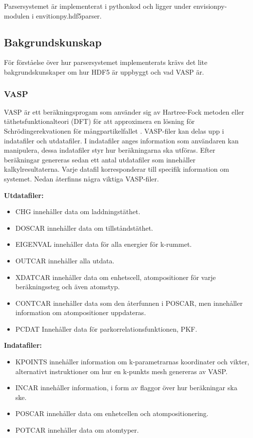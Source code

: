 \documentclass[10pt,oneside,swedish]{article}
\providecommand{\tightlist}{%
  \setlength{\itemsep}{0pt}\setlength{\parskip}{0pt}}
\begin{document}
Parsersystemet är implementerat i pythonkod och ligger under
envisionpy-modulen i envitionpy.hdf5parser.

\subsection{Bakgrundskunskap}\label{bakgrundskunskap}

För förståelse över hur parsersystemet implementerats krävs det lite
bakgrundskunskaper om hur HDF5 är uppbyggt och vad VASP är.

\subsubsection{VASP}\label{vasp}

VASP är ett beräkningsprogam som använder sig av Hartree-Fock metoden
eller täthetsfunktionalteori (DFT) för att approximera en lösning för
Schrödingerekvationen för mångpartikelfallet \cite{QuickStartGuide}.
VASP-filer kan delas upp i indatafiler och utdatafiler. I indatafiler
anges information som användaren kan manipulera, dessa indatafiler styr
hur beräkningarna ska utföras. Efter beräkningar genereras sedan ett
antal utdatafiler som innehåller kalkylresultaterna. Varje datafil
korresponderar till specifik information om systemet. Nedan återfinns
några viktiga VASP-filer.

\textbf{Utdatafiler:}

\begin{itemize}
\tightlist
\item
  CHG innehåller data om laddningstäthet.
\item
  DOSCAR innehåller data om tillståndstäthet.
\item
  EIGENVAL innehåller data för alla energier för k-rummet.
\item
  OUTCAR innehåller alla utdata.
\item
  XDATCAR innehåller data om enhetscell, atompositioner för varje
  beräkningssteg och även atomstyp.
\item
  CONTCAR innehåller data som den återfunnen i POSCAR, men innehåller
  information om atompositioner uppdateras.
\item
  PCDAT Innehåller data för parkorrelationsfunktionen, PKF.
\end{itemize}

\textbf{Indatafiler:}

\begin{itemize}
\tightlist
\item
  KPOINTS innehåller information om k-parametrarnas koordinater och
  vikter, alternativt instruktioner om hur en k-punkts mesh genereras av
  VASP.
\item
  INCAR innehåller information, i form av flaggor över hur beräkningar
  ska ske.
\item
  POSCAR innehåller data om enhetcellen och atompositionering.
\item
  POTCAR innehåller data om atomtyper.
\end{itemize}
\end{document}
